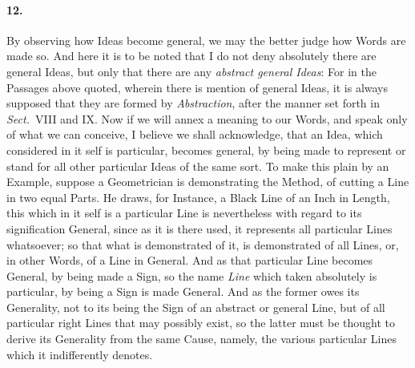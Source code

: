 \documentclass[]{article}
\newenvironment{sectionbody}{}{}
\begin{document}
\begin{sectionbody}
\paragraph{12.} By observing how Ideas become general, we may the better judge
how Words are made so.  And here it is to be noted that I do not
deny absolutely there are general Ideas, but only that there are
any \emph{abstract general Ideas}: For in the Passages above
quoted, wherein there is mention of general Ideas, it is always
supposed that they are formed by \emph{Abstraction}, after the
manner set forth in
\emph{Sect.}~VIII and IX.
Now if we will annex a meaning to our Words, and speak only of
what we can conceive, I believe we shall acknowledge, that an
Idea, which considered in it self is particular, becomes general,
by being made to represent or stand for all other particular
Ideas of the same sort.  To make this plain by an Example,
suppose a Geometrician is demonstrating the Method, of cutting a
Line in two equal Parts.  He draws, for Instance, a Black Line of
an Inch in Length, this which in it self is a particular Line is
nevertheless with regard to its signification General, since as
it is there used, it represents all particular Lines whatsoever;
so that what is demonstrated of it, is demonstrated of all Lines,
or, in other Words, of a Line in General.  And as that particular
Line becomes General, by being made a Sign, so the name
\emph{Line} which taken absolutely is particular, by being a
Sign is made General.  And as the former owes its Generality, not
to its being the Sign of an abstract or general Line, but of all
particular right Lines that may possibly exist, so the latter
must be thought to derive its Generality from the same Cause,
namely, the various particular Lines which it indifferently
denotes.




\end{sectionbody}
\end{document}
